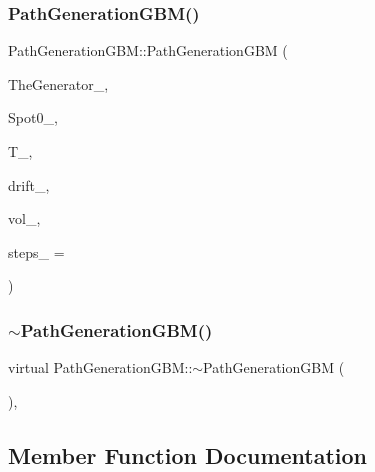 \subsubsection{\texorpdfstring{Path\+Generation\+G\+B\+M()}{PathGenerationGBM()}}
{\footnotesize\ttfamily Path\+Generation\+G\+B\+M\+::\+Path\+Generation\+G\+BM (\begin{DoxyParamCaption}\item[{shared\+\_\+ptr$<$ \hyperlink{classRandomBase}{Random\+Base} $>$}]{The\+Generator\+\_\+,  }\item[{double}]{Spot0\+\_\+,  }\item[{double}]{T\+\_\+,  }\item[{const \hyperlink{classParameters}{Parameters} \&}]{drift\+\_\+,  }\item[{const \hyperlink{classParameters}{Parameters} \&}]{vol\+\_\+,  }\item[{unsigned long}]{steps\+\_\+ = {} }\end{DoxyParamCaption})}

\hypertarget{classPathGenerationGBM_a9e6f1c4803d020420dbffdb3b1107a02}{}\label{classPathGenerationGBM_a9e6f1c4803d020420dbffdb3b1107a02} 
\subsubsection{\texorpdfstring{$\sim$\+Path\+Generation\+G\+B\+M()}{~PathGenerationGBM()}}
{\footnotesize\ttfamily virtual Path\+Generation\+G\+B\+M\+::$\sim$\+Path\+Generation\+G\+BM (\begin{DoxyParamCaption}{ }\end{DoxyParamCaption})\hspace{0.3cm}{\ttfamily [inline]}, {\ttfamily [virtual]}}



\subsection{Member Function Documentation}
\hypertarget{classPathGenerationGBM_afd14338fefddbe66fa7328e33a9ab60b}{}\label{classPathGenerationGBM_afd14338fefddbe66fa7328e33a9ab60b} 
